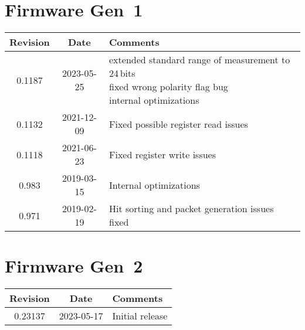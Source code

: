 \section{Firmware Gen~1}
\begin{tabularx}{\textwidth}{|c|c|X|}
    \hline
    Revision & Date & Comments\\
    \hline\hline
    \hypertarget{fwrev}{0.1187} & 2023-05-25 & 
    \makecell[l] {
        extended standard range of measurement to 24\,bits\\*
        fixed wrong polarity flag bug\\*
        internal optimizations
    }\\
    \hline
    0.1132 & 2021-12-09 & Fixed possible register read issues\\
    \hline
	0.1118 & 2021-06-23 & Fixed register write issues\\
    \hline
    0.983 & 2019-03-15 & Internal optimizations\\
    \hline
    0.971 & 2019-02-19 & Hit sorting and packet generation issues fixed\\
    \hline
\end{tabularx}

\section{Firmware Gen~2}
\begin{tabularx}{\textwidth}{|c|c|X|}
    \hline
    Revision & Date & Comments\\
    \hline\hline
    0.23137 & 2023-05-17 & Initial release\\ 
    \hline
\end{tabularx}